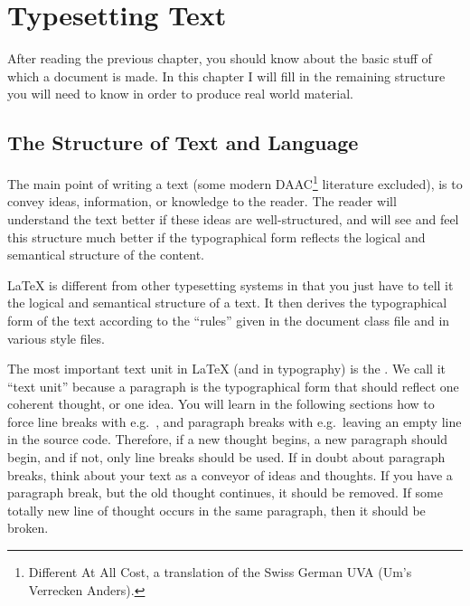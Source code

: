 \chapter{Typesetting Text}

\begin{intro}
  After reading the previous chapter, you should know about the basic
  stuff of which a \LaTeXe{} document is made. In this chapter I
  will fill in the remaining structure you will need to know in order
  to produce real world material.
\end{intro}

\section{The Structure of Text and Language}
The main point of writing a text (some modern DAAC\footnote{Different
  At All Cost, a translation of the Swiss German UVA (Um's Verrecken
  Anders).} literature excluded), is to convey ideas, information, or
knowledge to the reader.  The reader will understand the text better
if these ideas are well-structured, and will see and feel this
structure much better if the typographical form reflects the logical
and semantical structure of the content.

\LaTeX{} is different from other typesetting systems in that you just
have to tell it the logical and semantical structure of a text.  It
then derives the typographical form of the text according to the
``rules'' given in the document class file and in various style files.

The most important text unit in \LaTeX{} (and in typography) is the
.  We call it ``text unit'' because a paragraph is the
typographical form that should reflect one coherent thought, or one idea. 
You will learn in the following sections how to force line breaks with
e.g.\ \texttt{\bs\bs}, and paragraph breaks with e.g.\ leaving an empty line
in the source code.  Therefore, if a new thought begins, a new paragraph
should begin, and if not, only line breaks should be used.  If in doubt
about paragraph breaks, think about your text as a conveyor of ideas and
thoughts.  If you have a paragraph break, but the old thought continues, it
should be removed.  If some totally new line of thought occurs in the same
paragraph, then it should be broken.


